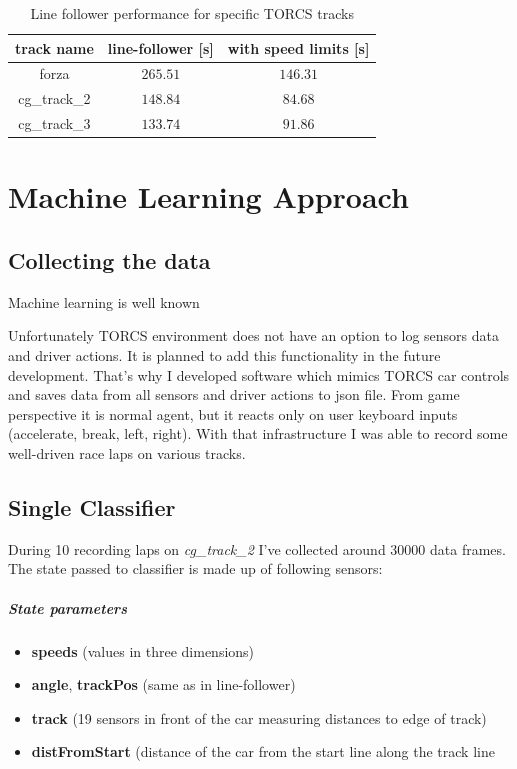 \documentclass[declaration,shortabstract,english,inz]{iithesis}
\begin{document}
\begin{table}[h]
    \centering
    \begin{tabular}{ |c|c|c|}
          \hline
          track name & line-follower [s] & with speed limits [s] \\
          \hline
          forza & $265.51$ & $146.31$  \\
          \hline
          cg\_track\_2 & $148.84$ &  $84.68$\\
          \hline
          cg\_track\_3 & $133.74$ & $91.86$ \\
          \hline
        \end{tabular}
        \caption{Line follower performance for specific TORCS tracks}
        \label{tab:line_follower}

\end{table}

\chapter{Machine Learning Approach}

\section{Collecting the data}

Machine learning is well known 

Unfortunately TORCS environment does not have an option to log sensors data and driver actions. It is planned to add this functionality in the future development. That's why I developed software which mimics TORCS car controls and saves data from all sensors and driver actions to json file. From game perspective it is normal agent, but it reacts only on user keyboard inputs (accelerate, break, left, right).  With that infrastructure I was able to record some well-driven race laps on various tracks.  

\section{Single Classifier}

During 10 recording laps on \textit{cg\_track\_2} I've collected around 30000 data frames. The state passed to classifier is made up of following sensors:

\paragraph{State parameters}
\begin{itemize}
    \item \textbf{speeds} (values in three dimensions)
    \item \textbf{angle}, \textbf{trackPos} (same as in line-follower) 
    \item \textbf{track}  (19 sensors in front of the car measuring distances to edge of track) 
    \item \textbf{distFromStart} (distance of the car from the start line along the track line
\end{itemize}
\end{document}
